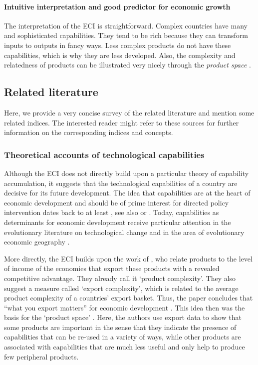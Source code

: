\documentclass[abstract=on]{scrartcl}
\begin{document}
\paragraph{Intuitive interpretation and good predictor for economic growth}
The interpretation of the ECI is straightforward.
Complex countries have many and sophisticated capabilities.
They tend to be rich because they can transform inputs to outputs in fancy ways.
Less complex products do not have these capabilities, which is why they are less developed.
Also, the complexity and relatedness of products can be illustrated very nicely through the \textit{product space} \citep{Hidalgo:2007cp}.


\subsection{Related literature}
Here, we provide a very concise survey of the related literature and mention some related indices.
The interested reader might refer to these sources for further information on the corresponding indices and concepts.

\subsubsection{Theoretical accounts of technological capabilities}
Although the ECI does not directly build upon a particular theory of capability accumulation, it suggests that the technological capabilities of a country are decisive for its future development.
The idea that capabilities are at the heart of economic development and should be of prime interest for directed policy intervention dates back to at least \citet{Hirschman:1958wr}, see also \citet{Lall:1992eq} or \citet{Bell:1995wj}.
Today, capabilities as determinants for economic development receive particular attention in the evolutionary literature on technological change \citep[see e.g.][]{Dosi:2015ug} and in the area of evolutionary economic geography \citep[e.g.][]{Boschma:2016kg}.

More directly, the ECI builds upon the work of \citet{Hausmann:2007hj}, who relate products to the level of income of the economies that export these products with a revealed competitive advantage.
They already call it `product complexity'. 
They also suggest a measure called `export complexity', which is related to the average product complexity of a countries' export basket.
Thus, the paper concludes that ``what you export matters'' for economic development \citep[p. 1]{Hausmann:2007hj}.
This idea then was the basis for the `product space' \citep{Hidalgo:2007cp}.
Here, the authors use export data to show that some products are important in the sense that they indicate the presence of capabilities that can be re-used in a variety of ways, while other products are associated with capabilities that are much less useful and only help to produce few peripheral products.
\end{document}
